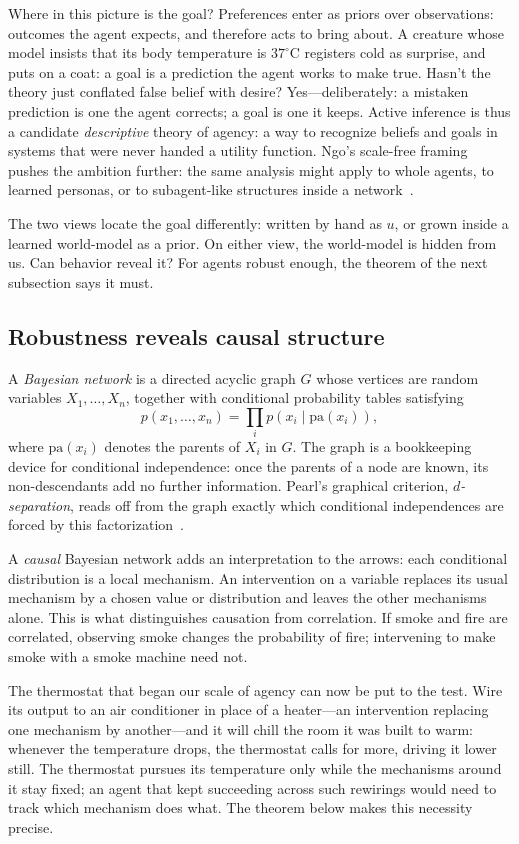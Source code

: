 Where in this picture is the goal? Preferences enter as priors over observations: outcomes the agent expects, and therefore acts to bring about. A creature whose model insists that its body temperature is $37^\circ$C registers cold as surprise, and puts on a coat: a goal is a prediction the agent works to make true. Hasn't the theory just conflated false belief with desire? Yes---deliberately: a mistaken prediction is one the agent corrects; a goal is one it keeps. Active inference is thus a candidate \emph{descriptive} theory of agency: a way to recognize beliefs and goals in systems that were never handed a utility function. Ngo's scale-free framing pushes the ambition further: the same analysis might apply to whole agents, to learned personas, or to subagent-like structures inside a network~\cite{ngo2025scale}.


The two views locate the goal differently: written by hand as $u$, or grown inside a learned world-model as a prior. On either view, the world-model is hidden from us. Can behavior reveal it? For agents robust enough, the theorem of the next subsection says it must.

\subsection{Robustness reveals causal structure}

A \emph{Bayesian network} is a directed acyclic graph $G$ whose vertices are random variables $X_1,\dots,X_n$, together with conditional probability tables satisfying
\[
   p(x_1,\dots,x_n)=\prod_i p\!\left(x_i\mid \mathrm{pa}(x_i)\right),
\]
where $\mathrm{pa}(x_i)$ denotes the parents of $X_i$ in $G$. The graph is a bookkeeping device for conditional independence: once the parents of a node are known, its non-descendants add no further information. Pearl's graphical criterion, \emph{$d$-separation}, reads off from the graph exactly which conditional independences are forced by this factorization~\cite{pearl2009}.

A \emph{causal} Bayesian network adds an interpretation to the arrows: each conditional distribution is a local mechanism. An intervention on a variable replaces its usual mechanism by a chosen value or distribution and leaves the other mechanisms alone. This is what distinguishes causation from correlation. If smoke and fire are correlated, observing smoke changes the probability of fire; intervening to make smoke with a smoke machine need not.

The thermostat that began our scale of agency can now be put to the test. Wire its output to an air conditioner in place of a heater---an intervention replacing one mechanism by another---and it will chill the room it was built to warm: whenever the temperature drops, the thermostat calls for more, driving it lower still. The thermostat pursues its temperature only while the mechanisms around it stay fixed; an agent that kept succeeding across such rewirings would need to track which mechanism does what. The theorem below makes this necessity precise.

